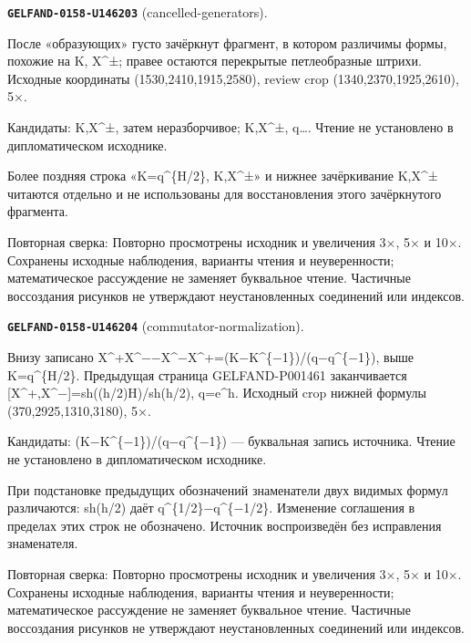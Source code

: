 \par\noindent\leavevmode{}\label{GELFAND-0158-U146203}\label{GELFAND-P001462:cancelled-generators}\textbf{\texttt{GELFAND-0158-U146203}} (cancelled-generators).\nopagebreak[4]\par
После «образующих» густо зачёркнут фрагмент, в котором различимы формы, похожие на K, X\textasciicircum{}±; правее остаются перекрытые петлеобразные штрихи. Исходные координаты (1530,2410,1915,2580), review crop (1340,2370,1925,2610), 5×.\par
Кандидаты: K,X\textasciicircum{}±, затем неразборчивое; K,X\textasciicircum{}±, q…. Чтение не установлено в дипломатическом исходнике.\par
Более поздняя строка «K=q\textasciicircum{}\{H/2\}, K,X\textasciicircum{}±» и нижнее зачёркивание K,X\textasciicircum{}± читаются отдельно и не использованы для восстановления этого зачёркнутого фрагмента.\par
Повторная сверка: Повторно просмотрены исходник и увеличения 3×, 5× и 10×. Сохранены исходные наблюдения, варианты чтения и неуверенности; математическое рассуждение не заменяет буквальное чтение. Частичные воссоздания рисунков не утверждают неустановленных соединений или индексов.\par\medskip
\par\noindent\leavevmode{}\label{GELFAND-0158-U146204}\label{GELFAND-P001462:commutator-normalization}\textbf{\texttt{GELFAND-0158-U146204}} (commutator-normalization).\nopagebreak[4]\par
Внизу записано X\textasciicircum{}+X\textasciicircum{}−−X\textasciicircum{}−X\textasciicircum{}+=(K−K\textasciicircum{}\{−1\})/(q−q\textasciicircum{}\{−1\}), выше K=q\textasciicircum{}\{H/2\}. Предыдущая страница GELFAND-P001461 заканчивается [X\textasciicircum{}+,X\textasciicircum{}−]=sh((h/2)H)/sh(h/2), q=e\textasciicircum{}h. Исходный crop нижней формулы (370,2925,1310,3180), 5×.\par
Кандидаты: (K−K\textasciicircum{}\{−1\})/(q−q\textasciicircum{}\{−1\}) — буквальная запись источника. Чтение не установлено в дипломатическом исходнике.\par
При подстановке предыдущих обозначений знаменатели двух видимых формул различаются: sh(h/2) даёт q\textasciicircum{}\{1/2\}−q\textasciicircum{}\{−1/2\}. Изменение соглашения в пределах этих строк не обозначено. Источник воспроизведён без исправления знаменателя.\par
Повторная сверка: Повторно просмотрены исходник и увеличения 3×, 5× и 10×. Сохранены исходные наблюдения, варианты чтения и неуверенности; математическое рассуждение не заменяет буквальное чтение. Частичные воссоздания рисунков не утверждают неустановленных соединений или индексов.\par\medskip
